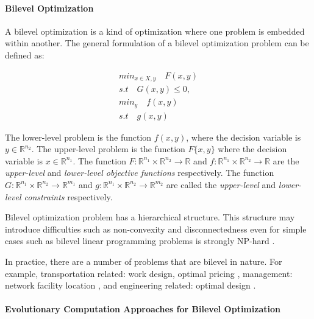 \paragraph{Bilevel Optimization}
\label{bilevel}

A bilevel optimization \cite{Colson:2007bu} is a kind of optimization where one problem is embedded within another.
The general formulation of a bilevel optimization problem can be defined as: 

\begin{subequations}
\label{eq:bilevel}
	\begin{align}
	min_{x \in X, y} 	\quad F(x, y) \\
	s.t 			\quad G(x, y) \leq 0, \\
	min_y			\quad f(x, y) \\
	s.t 			\quad g(x, y)
	\end{align}
\end{subequations}

The lower-level problem is the function $f(x, y)$, where the decision variable is $y \in \mathbb{R}^{n_2}$. The upper-level problem is the function $F\{x, y\}$ where the decision variable is $x \in \mathbb{R}^{n_1}$.
The function $F : \mathbb{R}^{n_1} \times  \mathbb{R}^{n_2} \to \mathbb{R}$ and $f : \mathbb{R}^{n_1} \times  \mathbb{R}^{n_2} \to \mathbb{R}$ are the \emph{upper-level} and \emph{lower-level objective functions} respectively. The function $G : \mathbb{R}^{n_1} \times  \mathbb{R}^{n_2} \to \mathbb{R}^{m_1}$ and $g : \mathbb{R}^{n_1} \times  \mathbb{R}^{n_2} \to \mathbb{R}^{m_2}$ are called the \emph{upper-level} and \emph{lower-level constraints} respectively. 

Bilevel optimization problem has a hierarchical structure. This structure may introduce difficulties such as non-convexity and disconnectedness even for simple cases such as bilevel linear programming problems is strongly NP-hard \cite{Sinha:2013tn}. 

In practice, there are a number of problems that are bilevel in nature. For example, transportation related: work design, optimal pricing \cite{Brotcorne:2001je, Constantin:1995hu}, management: network facility location \cite{Sun:2008gq},  and engineering related: optimal design \cite{KirjnerNeto:1998ef}. 




\paragraph{Evolutionary Computation Approaches for Bilevel Optimization}


